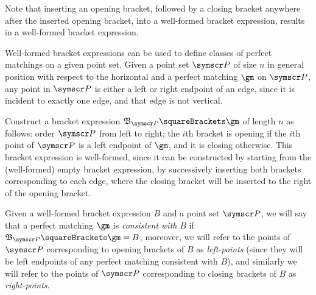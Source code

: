 \documentclass[10pt, a4paper, twoside]{basestyle}
\newcommand{\pointset}{\symscr}
\newcommand{\bracketing}{\mathfrak{B}}
\begin{document}
Note that inserting an opening bracket, followed by a closing bracket anywhere after the
inserted opening bracket, into a well-formed bracket expression, results in a well-formed bracket
expression.

Well-formed bracket expressions can be used to define classes of perfect matchings on a given point set.
Given a point set $\pointset P$  of size $n$ in general position with respect to the horizontal and a perfect
matching $\gm$ on $\pointset P$, any point in $\pointset P$ is either a left or right endpoint of an edge, since it
is incident to exactly one edge, and that edge is not vertical.

Construct a bracket expression $\bracketing_{\pointset P}\of\gm$ of length $n$ as follows: order $\pointset P$ from left
to right;
the $i$th bracket is opening if the $i$th point of $\pointset P$ is a left endpoint of $\gm$, and it is
closing otherwise.
This bracket expression is well-formed, since it can be constructed by starting from the
(well-formed) empty bracket expression, by successively inserting both brackets corresponding to
each edge, where the closing bracket will be inserted to the right of the opening bracket.

Given a well-formed bracket expression $B$ and a point set $\pointset P$, we will say that a perfect matching
$\gm$ is \emph{consistent with} $B$ if $\bracketing_{\pointset P}\of\gm = B$; moreover, we will refer to the points of
$\pointset P$ corresponding to opening brackets of $B$ as \emph{left-points} (since they will be left endpoints
of any perfect matching consistent with $B$), and similarly we will refer to the points of $\pointset P$
corresponding to closing brackets of $B$ as \emph{right-points}.
\end{document}
